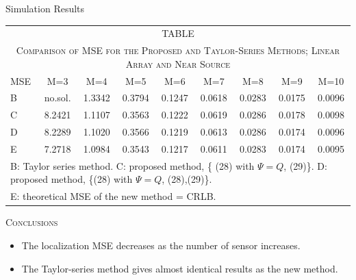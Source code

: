 \documentclass[10pt]{beamer}
\begin{document}
\begin{frame}{Simulation Results}
  \begin{center}
  \begin{tabular}{l c c c c c c c c}\\
  \multicolumn{9}{c}{TABLE \uppercase\expandafter{\romannumeral2}}\\
  \multicolumn{9}{c}{\textsc{\tiny Comparison of MSE for the Proposed and Taylor-Series Methods; Linear Array and Near Source}}\\\hline
  \scriptsize MSE  &   \scriptsize  M=3   &  \scriptsize  M=4    &  \scriptsize M=5    &  \scriptsize  M=6    &  \scriptsize  M=7    &  \scriptsize M=8    &  \scriptsize  M=9     &  \scriptsize  M=10   \\\hline
  \scriptsize B    &   \scriptsize no.sol.&  \scriptsize  1.3342 &  \scriptsize 0.3794 &  \scriptsize  0.1247 &  \scriptsize  0.0618 &  \scriptsize 0.0283 &  \scriptsize  0.0175  &  \scriptsize  0.0096 \\
  \scriptsize C    &   \scriptsize 8.2421 &  \scriptsize  1.1107 &  \scriptsize 0.3563 &  \scriptsize  0.1222 &  \scriptsize  0.0619 &  \scriptsize 0.0286 &  \scriptsize  0.0178  &  \scriptsize  0.0098 \\
  \scriptsize D    &   \scriptsize 8.2289 &  \scriptsize  1.1020 &  \scriptsize 0.3566 &  \scriptsize  0.1219 &  \scriptsize  0.0613 &  \scriptsize 0.0286 &  \scriptsize  0.0174  &  \scriptsize  0.0096 \\
  \scriptsize E    &   \scriptsize 7.2718 &  \scriptsize  1.0984 &  \scriptsize 0.3543 &  \scriptsize  0.1217 &  \scriptsize  0.0611 &  \scriptsize 0.0283 &  \scriptsize  0.0174  &  \scriptsize  0.0095 \\\hline
  \multicolumn{9}{l}{\tiny B: Taylor series method. C: proposed method, \{ (28) with $\Psi = Q$, (29)\}. D: proposed method, \{(28) with $\Psi = Q$, (28),(29)\}. }\\
  \multicolumn{9}{l}{\tiny E: theoretical MSE of the new method = CRLB.}
  \end{tabular}
  \end{center}
  \begin{center} \textsc{Conclusions} \end{center}
  \begin{itemize}
		\item \small The localization MSE decreases as the number of sensor increases.
		\item \small The Taylor-series method gives almost identical results as the new method.
	\end{itemize}
\end{frame}
\end{document}
